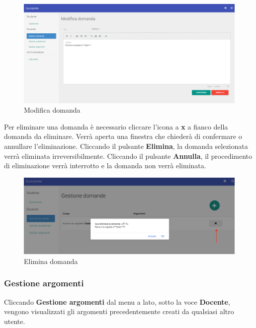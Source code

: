 \documentclass[12pt,a4paper]{article}
\begin{document}
		\begin{figure}[H]	
			\centering
			\includegraphics[width=\linewidth]{../img/screenshot/modificaDomanda.png}
			\caption{Modifica domanda}
			\label{Modifica domanda}
		\end{figure}
	
	
	\par Per eliminare una domanda è necessario cliccare l'icona a \textbf{x} a fianco della domanda da eliminare.
	Verrà aperta una finestra che chiederà di confermare o annullare l'eliminazione. Cliccando il pulsante \textbf{Elimina}, la domanda selezionata verrà eliminata irreversibilmente. Cliccando il pulsante \textbf{Annulla}, il procedimento di eliminazione verrà interrotto e la domanda non verrà eliminata. \\
	
	\begin{figure}[H]	
		\centering
		\includegraphics[width=1.0\linewidth]{../img/screenshot/eliminaDomanda.png}
		\caption{Elimina domanda}
		\label{Elimina domanda}
	\end{figure}
		
	\subsubsection{Gestione argomenti}
	\par Cliccando \textbf{Gestione argomenti} dal menu a lato, sotto la voce \textbf{Docente}, vengono visualizzati gli argomenti precedentemente creati da qualsiasi altro utente.
	
\end{document}
